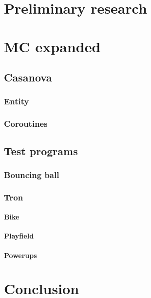 \begin{multicols}{3}



\part{Preliminary research}



\part{MC expanded}\label{part:mcexpanded}





\chapter{Casanova}
\section{Entity}
\section{Coroutines}

\chapter{Test programs}
\section{Bouncing ball}
\section{Tron}
\subsection{Bike}
\subsection{Playfield}
\subsection{Powerups}


\part{Conclusion}


\end{multicols}
